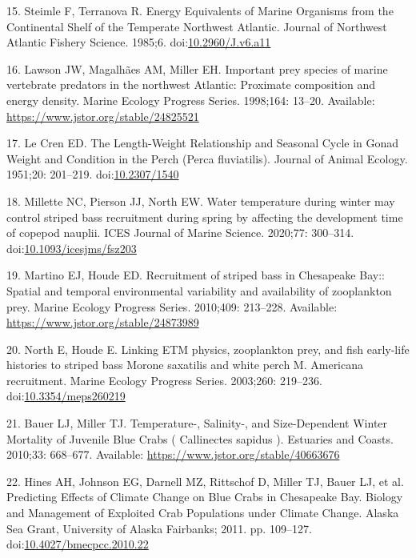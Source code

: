 \documentclass[
  10pt,
]{article}
\begin{document}
\leavevmode\hypertarget{ref-steimle_energy_1985}{}%
15. Steimle F, Terranova R. Energy Equivalents of Marine Organisms from
the Continental Shelf of the Temperate Northwest Atlantic. Journal of
Northwest Atlantic Fishery Science. 1985;6.
doi:\href{https://doi.org/10.2960/J.v6.a11}{10.2960/J.v6.a11}

\leavevmode\hypertarget{ref-lawson_important_1998}{}%
16. Lawson JW, Magalhães AM, Miller EH. Important prey species of marine
vertebrate predators in the northwest Atlantic: Proximate composition
and energy density. Marine Ecology Progress Series. 1998;164: 13--20.
Available: \url{https://www.jstor.org/stable/24825521}

\leavevmode\hypertarget{ref-le_cren_length-weight_1951}{}%
17. Le Cren ED. The Length-Weight Relationship and Seasonal Cycle in
Gonad Weight and Condition in the Perch (Perca fluviatilis). Journal of
Animal Ecology. 1951;20: 201--219.
doi:\href{https://doi.org/10.2307/1540}{10.2307/1540}

\leavevmode\hypertarget{ref-millette_water_2020}{}%
18. Millette NC, Pierson JJ, North EW. Water temperature during winter
may control striped bass recruitment during spring by affecting the
development time of copepod nauplii. ICES Journal of Marine Science.
2020;77: 300--314.
doi:\href{https://doi.org/10.1093/icesjms/fsz203}{10.1093/icesjms/fsz203}

\leavevmode\hypertarget{ref-martino_recruitment_2010}{}%
19. Martino EJ, Houde ED. Recruitment of striped bass in Chesapeake
Bay:: Spatial and temporal environmental variability and availability of
zooplankton prey. Marine Ecology Progress Series. 2010;409: 213--228.
Available: \url{https://www.jstor.org/stable/24873989}

\leavevmode\hypertarget{ref-north_linking_2003}{}%
20. North E, Houde E. Linking ETM physics, zooplankton prey, and fish
early-life histories to striped bass Morone saxatilis and white perch M.
Americana recruitment. Marine Ecology Progress Series. 2003;260:
219--236.
doi:\href{https://doi.org/10.3354/meps260219}{10.3354/meps260219}

\leavevmode\hypertarget{ref-bauer_temperature-_2010}{}%
21. Bauer LJ, Miller TJ. Temperature-, Salinity-, and Size-Dependent
Winter Mortality of Juvenile Blue Crabs ( Callinectes sapidus ).
Estuaries and Coasts. 2010;33: 668--677. Available:
\url{https://www.jstor.org/stable/40663676}

\leavevmode\hypertarget{ref-hines_predicting_2011}{}%
22. Hines AH, Johnson EG, Darnell MZ, Rittschof D, Miller TJ, Bauer LJ,
et al. Predicting Effects of Climate Change on Blue Crabs in Chesapeake
Bay. Biology and Management of Exploited Crab Populations under Climate
Change. Alaska Sea Grant, University of Alaska Fairbanks; 2011. pp.
109--127.
doi:\href{https://doi.org/10.4027/bmecpcc.2010.22}{10.4027/bmecpcc.2010.22}
\end{document}
